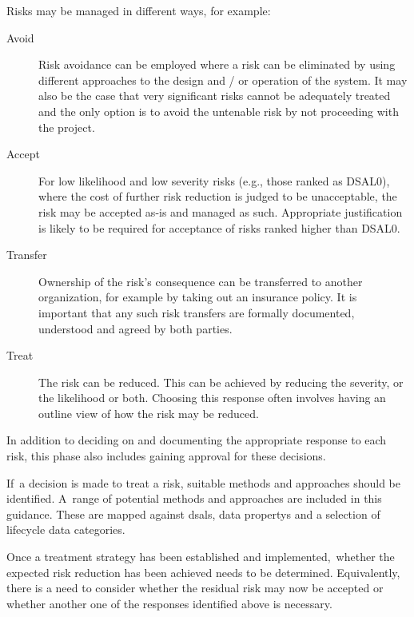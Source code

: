 Risks may be managed in different ways, for example:

\begin{description}
  \item[Avoid]Risk avoidance can be employed where a risk can be eliminated by using different approaches to the design and / or operation of the system. It may also be the case that very significant risks cannot be adequately treated and the only option is to avoid the untenable risk by not proceeding with the project.
  \item[Accept]For low likelihood and low severity risks (e.g., those ranked as DSAL0), where the cost of further risk reduction is judged to be unacceptable, the risk may be accepted as-is and managed as such. Appropriate justification is likely to be required for acceptance of risks ranked higher than DSAL0.
  \cbstart\item[Transfer]Ownership of the risk's consequence can be transferred to another organization, for example by taking out an insurance policy. It is important that any such risk transfers are formally documented, understood and agreed by both parties.
  \item[Treat]The risk can be reduced. This can be achieved by reducing the severity, or the likelihood or both. Choosing this \gls{response} often involves having an outline view of how the risk may be reduced. \cbend\
\end{description}

In addition to deciding on and documenting the appropriate \gls{response} to each risk, this phase also includes gaining approval for these decisions.

\cbstart If\cbend\ a decision is made to treat a risk, suitable methods and approaches should be identified. \cbstart A\cbend\ range of potential methods and approaches are included in this guidance. These are mapped against \glspl{dsal}, \glspl{data property} and a selection of lifecycle data categories.

Once a \gls{treatment} strategy has been established and implemented,\cbstart\ whether the expected risk reduction has been achieved needs to be determined\cbend. Equivalently, there is a need to consider whether the residual risk may now be accepted \cbstart or whether another one of the \glspl{response} identified above is necessary\cbend.

